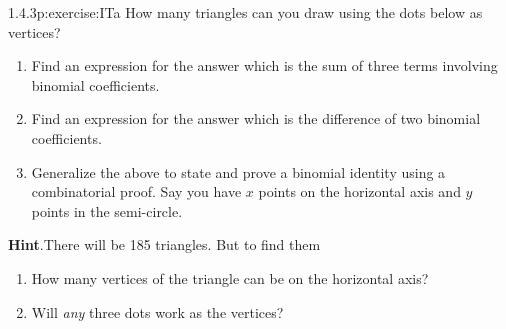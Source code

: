 \documentclass[twoside,11pt,]{book}
\newcommand{\blocktitlefont}{\relax}
\numberwithin{equation}{chapter}
\begin{document}
\begin{divisionsolution}{1.4.3}{}{p:exercise:ITa}%
How many triangles can you draw using the dots below as vertices?%
\begin{sidebyside}{1}{0.3}{0.3}{0}%
\begin{sbspanel}{0.4}%
%
\end{sbspanel}%
\end{sidebyside}%
\par
%
\begin{enumerate}[label=(\alph*)]
\item{}Find an expression for the answer which is the sum of three terms involving binomial coefficients.%
\item{}Find an expression for the answer which is the difference of two  binomial coefficients.%
\item{}Generalize the above to state and prove a binomial identity using a combinatorial proof.  Say you have \(x\) points on the horizontal axis and \(y\) points in the semi-circle.%
\end{enumerate}
%
\par\smallskip%
\noindent\textbf{\blocktitlefont Hint}.\quad{}There will be 185 triangles.  But to find them \textellipsis{}%
\begin{enumerate}[label=(\alph*)]
\item{}How many vertices of the triangle can be on the horizontal axis?%
\item{}Will \emph{any} three dots work as the vertices?%
\end{enumerate}
%
\end{divisionsolution}%
\end{document}
